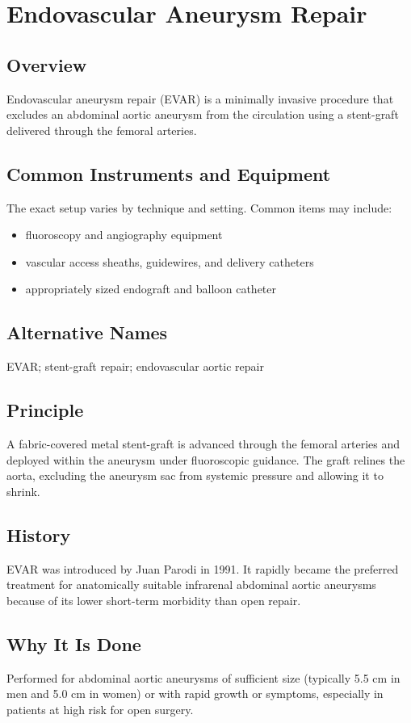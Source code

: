\chapter{Endovascular Aneurysm Repair}

\section*{Overview}
Endovascular aneurysm repair (EVAR) is a minimally invasive procedure that excludes an abdominal aortic aneurysm from the circulation using a stent-graft delivered through the femoral arteries.

\section*{Common Instruments and Equipment}
The exact setup varies by technique and setting. Common items may include:
\begin{itemize}[nosep,leftmargin=*]
  \item fluoroscopy and angiography equipment
  \item vascular access sheaths, guidewires, and delivery catheters
  \item appropriately sized endograft and balloon catheter
\end{itemize}

\section*{Alternative Names}
EVAR; stent-graft repair; endovascular aortic repair

\section*{Principle}
A fabric-covered metal stent-graft is advanced through the femoral arteries and deployed within the aneurysm under fluoroscopic guidance. The graft relines the aorta, excluding the aneurysm sac from systemic pressure and allowing it to shrink.

\section*{History}
EVAR was introduced by Juan Parodi in 1991. It rapidly became the preferred treatment for anatomically suitable infrarenal abdominal aortic aneurysms because of its lower short-term morbidity than open repair.

\section*{Why It Is Done}
Performed for abdominal aortic aneurysms of sufficient size (typically 5.5 cm in men and 5.0 cm in women) or with rapid growth or symptoms, especially in patients at high risk for open surgery.

